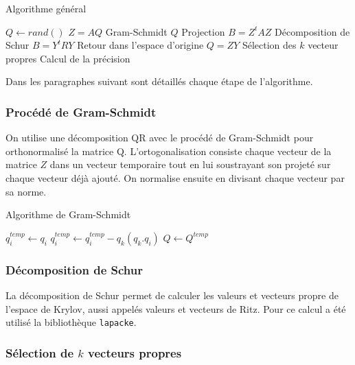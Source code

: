 \documentclass[11pt,a4paper]{article}
\begin{document}
		\begin{algorithm}
			\caption{Algorithme général}
			\begin{algorithmic}[1]
					\State $Q \gets rand()$
						\State $Z = AQ$
						\State Gram-Schmidt $Q$
						\State Projection $B = Z^tAZ$
						\State Décomposition de Schur $B = Y^tRY$
						\State Retour dans l'espace d'origine $Q = ZY$
						\State Sélection des $k$ vecteur propres
						\State Calcul de la précision
					\EndWhile
				\end{algorithmic}
		\end{algorithm}

		Dans les paragraphes suivant sont détaillés chaque étape de l'algorithme.

		\subsubsection{Procédé de Gram-Schmidt}

			On utilise une décomposition QR avec le procédé de Gram-Schmidt pour orthonormalisé la matrice Q. L'ortogonalisation consiste chaque vecteur de la matrice $Z$ dans un vecteur temporaire tout en lui soustrayant son projeté sur chaque vecteur déjà ajouté. On normalise ensuite en divisant chaque vecteur par sa norme.

			\begin{algorithm}
				\caption{Algorithme de Gram-Schmidt}
				\begin{algorithmic}[1]
					\For {$i = 0..m-1$}
						\State $q^{temp}_i \gets q_i$
						\For{$k = 0..i$}
						\State $q^{temp}_i \gets q^{temp}_i - q_k(q_k.q_i)$
						\EndFor
					\EndFor
					\State $Q \gets Q^{temp}$
				\end{algorithmic}
			\end{algorithm}

		\subsubsection{Décomposition de Schur}

		La décomposition de Schur permet de calculer les valeurs et vecteurs propre de l'espace de Krylov, aussi appelés valeurs et vecteurs de Ritz. Pour ce calcul a été utilisé la bibliothèque \texttt{lapacke}.

		\subsubsection{Sélection de $k$ vecteurs propres}
\end{document}
